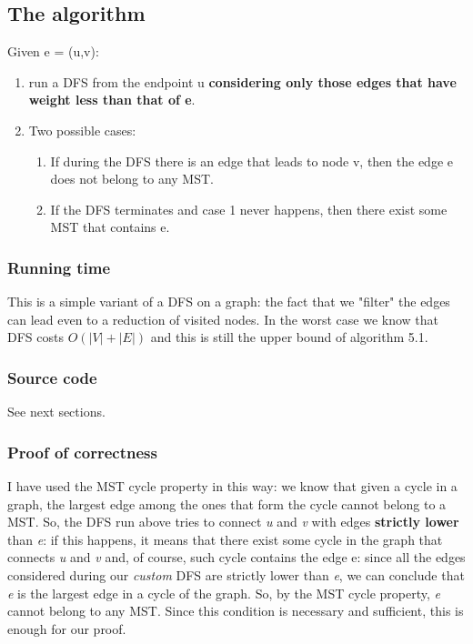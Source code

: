 \documentclass[12pt]{article}
\begin{document}
\subsection{The algorithm}
Given e = (u,v):
\begin{enumerate}
	\item run a DFS from the endpoint u \textbf{considering only those edges that have weight less than that of e}.
	\item Two possible cases:
	\begin{enumerate}
		\item If during the DFS there is an edge that leads to node v, then the edge e does not belong to any MST.
		\item If the DFS terminates and case 1 never happens, then there exist some MST that contains e.
	\end{enumerate}
\end{enumerate}

\subsubsection{Running time}
This is a simple variant of a DFS on a graph: the fact that we "filter" the edges can lead even to a reduction of visited nodes. In the worst case we know that DFS costs $O(|V| + |E|)$ and this is still the upper bound of algorithm 5.1.

\subsubsection{Source code}
See next sections.

\subsubsection{Proof of correctness}
I have used the MST cycle property in this way: we know that given a cycle in a graph, the largest edge among the ones that form the cycle cannot belong to a MST. So, the DFS run above tries to connect \textit{u} and \textit{v} with edges \textbf{strictly lower} than \textit{e}: if this happens, it means that there exist some cycle in the graph that connects \textit{u} and \textit{v} and, of course, such cycle contains the edge e: since all the edges considered during our \textit{custom} DFS are strictly lower than \textit{e}, we can conclude that \textit{e} is the largest edge in a cycle of the graph. So, by the MST cycle property, \textit{e} cannot belong to any MST. Since this condition is necessary and sufficient, this is enough for our proof.
\end{document}
